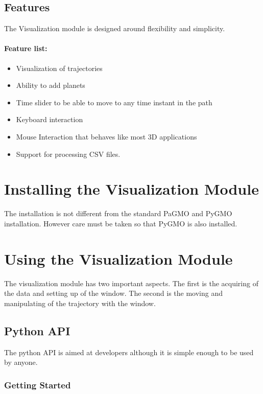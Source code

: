 \documentclass[a4paper,11pt]{article}
\begin{document}
\subsection{Features}

The Visualization module is designed around flexibility and simplicity. 

\paragraph{Feature list:}
\begin{itemize}
\item Visualization of trajectories
\item Ability to add planets
\item Time slider to be able to move to any time instant in the path
\item Keyboard interaction
\item Mouse Interaction that behaves like most 3D applications
\item Support for processing \gls{CSV} files.
\end{itemize}


\section{Installing the Visualization Module}

The installation is not different from the standard \gls{PaGMO} and \gls{PyGMO} installation\cite{install:pagmo}. However care must be taken so that \gls{PyGMO} is also installed.


\section{Using the Visualization Module}

The visualization module has two important aspects. The first is the acquiring of the data and setting up of the window. The second is the moving and manipulating of the trajectory with the window.


\subsection{Python API}

The \gls{python} \gls{API} is aimed at developers although it is simple enough to be used by anyone.

\subsubsection{Getting Started}
\end{document}
